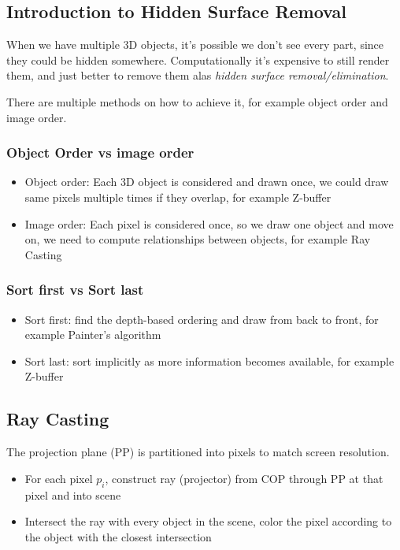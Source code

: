\documentclass[11pt]{article}
\begin{document}
\subsection{Introduction to Hidden Surface Removal}
When we have multiple 3D objects, it's possible we don't see every part, since they could be hidden somewhere. Computationally it's expensive to still render them, and just better to remove them alas \textit{hidden surface removal/elimination}.

There are multiple methods on how to achieve it, for example object order and image order.
\subsubsection*{Object Order vs image order}
\begin{itemize}
    \item Object order: Each 3D object is considered and drawn once, we could draw same pixels multiple times if they overlap, for example Z-buffer
    \item Image order: Each pixel is considered once, so we draw one object and move on, we need to compute relationships between objects, for example Ray Casting
\end{itemize}

\subsubsection*{Sort first vs Sort last}
\begin{itemize}
    \item Sort first: find the depth-based ordering and draw from back to front, for example Painter's algorithm
    \item Sort last: sort implicitly as more information becomes available, for example Z-buffer
\end{itemize}

\subsection{Ray Casting}
The projection plane (PP) is partitioned into pixels to match screen resolution. \begin{itemize}
    \item For each pixel $p_i$, construct ray (projector) from COP through PP at that pixel and into scene
    \item Intersect the ray with every object in the scene, color the pixel according to the object with the closest intersection 
\end{itemize}
\end{document}
